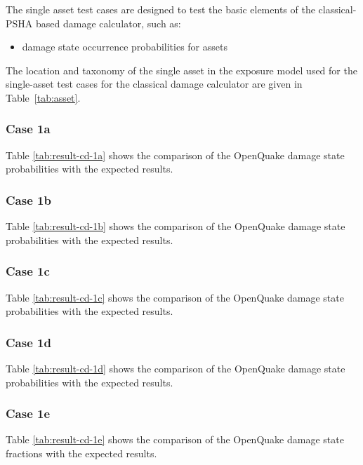 The single asset test cases are designed to test the basic elements of the classical-PSHA based damage calculator, such as:

\begin{itemize}
\item damage state occurrence probabilities for assets
\end{itemize}

The location and taxonomy of the single asset in the exposure model used for the single-asset test cases for the classical damage calculator are given in Table~\ref{tab:asset}.


\subsubsection{Case 1a}



Table \ref{tab:result-cd-1a} shows the comparison of the OpenQuake damage state probabilities with the expected results.

\subsubsection{Case 1b}



Table \ref{tab:result-cd-1b} shows the comparison of the OpenQuake damage state probabilities with the expected results.

\subsubsection{Case 1c}



Table \ref{tab:result-cd-1c} shows the comparison of the OpenQuake damage state probabilities with the expected results.

\subsubsection{Case 1d}



Table \ref{tab:result-cd-1d} shows the comparison of the OpenQuake damage state probabilities with the expected results.

\subsubsection{Case 1e}



Table \ref{tab:result-cd-1e} shows the comparison of the OpenQuake damage state fractions with the expected results.
